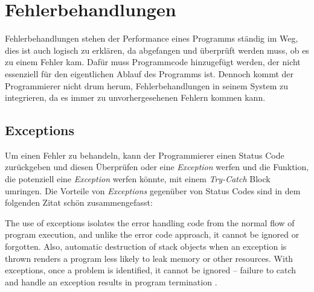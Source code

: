 \section{Fehlerbehandlungen}\label{sec:fehlerbehandlung}
Fehlerbehandlungen stehen der Performance eines Programms ständig im Weg, dies ist auch logisch
zu erklären, da abgefangen und überprüft werden muss, ob es zu einem Fehler kam. Dafür muss
Programmcode hinzugefügt werden, der nicht essenziell für den eigentlichen Ablauf des Programms
ist. Dennoch kommt der Programmierer nicht drum herum, Fehlerbehandlungen in seinem System zu
integrieren, da es immer zu unvorhergesehenen Fehlern kommen kann.

\subsection{Exceptions}\label{subsec:exceptions}
Um einen Fehler zu behandeln, kann der Programmierer einen Status Code zurückgeben und diesen
Überprüfen oder eine \emph{Exception} werfen und die Funktion, die potenziell eine
\emph{Exception} werfen könnte, mit einem \emph{Try-Catch} Block umringen. Die Vorteile von
\emph{Exceptions} gegenüber von Status Codes sind in dem folgenden Zitat schön zusammengefasst:

\begin{zitat}
    The use of exceptions isolates the error handling code from the normal flow of program
    execution, and unlike the error code approach, it cannot be ignored or forgotten. Also,
    automatic destruction of stack objects when an exception is thrown renders a program less
    likely to leak
    memory or other resources. With exceptions, once a problem is identified, it cannot be ignored –
    failure to catch and handle an exception results in program termination \cite{TechnicalReport}.
\end{zitat}

